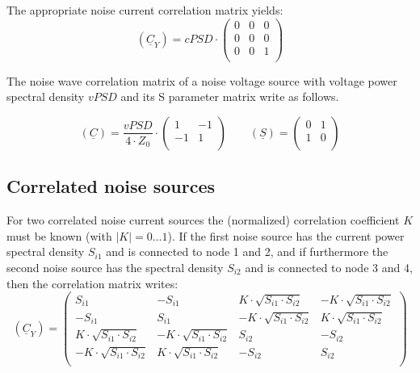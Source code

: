 The appropriate noise current correlation matrix yields:
\begin{equation}
(\underline{C}_Y) = cPSD \cdot
\begin{pmatrix}
 0 & 0 & 0\\
 0 & 0 & 0\\
 0 & 0 & 1\\
\end{pmatrix}
\end{equation}

The noise wave correlation matrix of a noise voltage source with
voltage power spectral density $vPSD$ and its S parameter matrix
write as follows.

\begin{equation}
(\underline{C}) = \frac{vPSD}{4\cdot Z_0}\cdot
\begin{pmatrix}
   1 & -1\\
  -1 &  1\\
\end{pmatrix}
\qquad
(\underline{S}) =
\begin{pmatrix}
   0 &  1\\
   1 &  0\\
\end{pmatrix}
\end{equation}


\subsection{Correlated noise sources}

For two correlated noise current sources the (normalized) correlation
coefficient $K$ must be known (with $|K|=0\dots 1$). If the first
noise source has the current power spectral
density $S_{i1}$ and is connected to node 1 and 2, and if furthermore
the second noise source has the spectral density $S_{i2}$ and is connected
to node 3 and 4, then the correlation matrix writes:
\begin{equation}
(\underline{C}_Y) =
\begin{pmatrix}
 S_{i1} & -S_{i1} &  K\cdot\sqrt{S_{i1}\cdot S_{i2}} & -K\cdot\sqrt{S_{i1}\cdot S_{i2}} \\
-S_{i1} &  S_{i1} & -K\cdot\sqrt{S_{i1}\cdot S_{i2}} &  K\cdot\sqrt{S_{i1}\cdot S_{i2}} \\
 K\cdot\sqrt{S_{i1}\cdot S_{i2}} & -K\cdot\sqrt{S_{i1}\cdot S_{i2}} &  S_{i2} & -S_{i2} \\
-K\cdot\sqrt{S_{i1}\cdot S_{i2}} &  K\cdot\sqrt{S_{i1}\cdot S_{i2}} & -S_{i2} &  S_{i2} \\
\end{pmatrix}
\end{equation}

